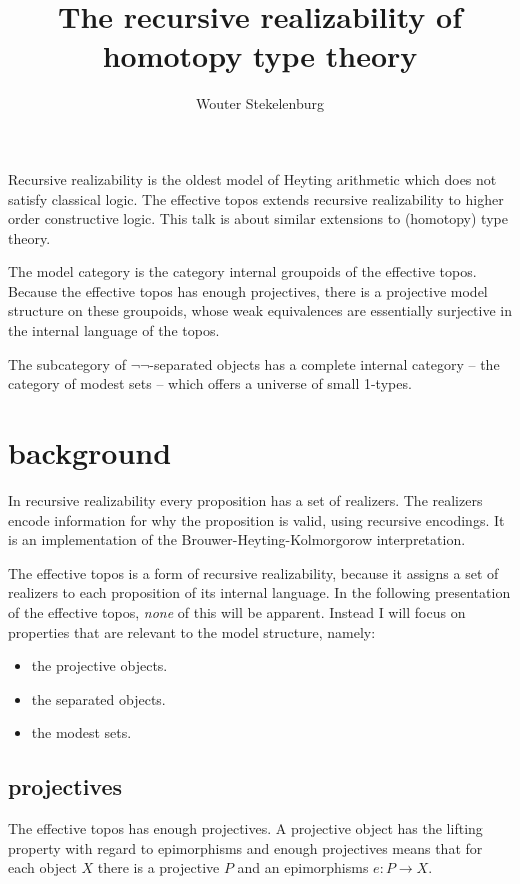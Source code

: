 \documentclass[12pt,a4paper]{article}
\title{The recursive realizability of homotopy type theory}
\author{Wouter Stekelenburg}
\date{}
\theoremstyle{definition}
\begin{document}
\maketitle

Recursive realizability is the oldest model of Heyting arithmetic which does not satisfy classical logic. The effective topos extends recursive realizability to higher order constructive logic. This talk is about similar extensions to (homotopy) type theory.

The model category is the category internal groupoids of the effective topos. Because the effective topos has enough projectives, there is a projective model structure on these groupoids, whose weak equivalences are essentially surjective in the internal language of the topos.

The subcategory of $\neg\neg$-separated objects has a complete internal category -- the category of modest sets -- which offers a universe of small 1-types.

\section{background}
In recursive realizability every proposition has a set of realizers. The realizers encode information for why the proposition is valid, using recursive encodings. It is an implementation of the Brouwer-Heyting-Kolmorgorow interpretation.

The effective topos is a form of recursive realizability, because it assigns a set of realizers to each proposition of its internal language. In the following presentation of the effective topos, \emph{none} of this will be apparent. Instead I will focus on properties that are relevant to the model structure, namely:

\newcommand\Set{\mathsf{Set}}
\newcommand\Eff{\mathsf{Eff}}
\begin{itemize}
\item the projective objects.
\item the separated objects.
\item the modest sets.
\end{itemize}

\subsection{projectives}
The effective topos has enough projectives. A projective object has the lifting property with regard to epimorphisms and enough projectives means that for each object $X$ there is a projective $P$ and an epimorphisms $e:P\to X$.
\end{document}
